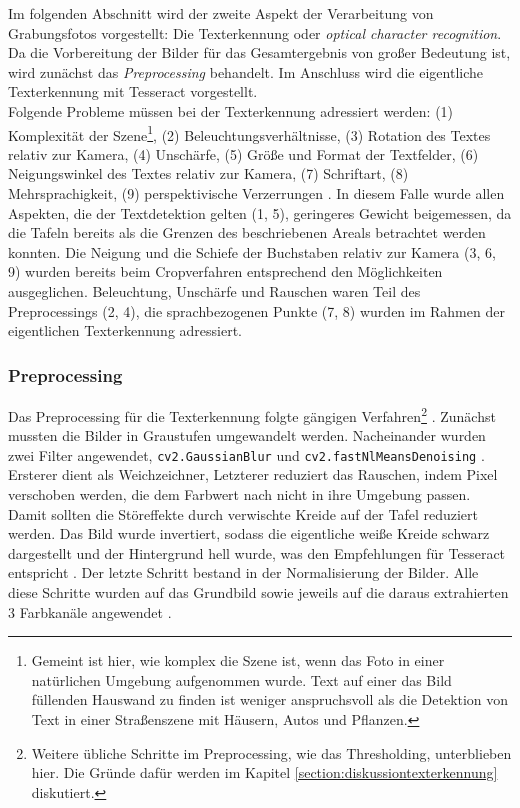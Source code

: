 Im folgenden Abschnitt wird der zweite Aspekt der Verarbeitung von Grabungsfotos vorgestellt: Die Texterkennung oder \textit{optical character recognition}. Da die Vorbereitung der Bilder für das Gesamtergebnis von großer Bedeutung ist, wird zunächst das \textit{Preprocessing} behandelt. Im Anschluss wird die eigentliche Texterkennung mit Tesseract vorgestellt.\\
Folgende Probleme müssen bei der Texterkennung adressiert werden: (1) Komplexität der Szene\footnote{Gemeint ist hier, wie komplex die Szene ist, wenn das Foto in einer natürlichen Umgebung aufgenommen wurde. Text auf einer das Bild füllenden Hauswand zu finden ist weniger anspruchsvoll als die Detektion von Text in einer Straßenszene mit Häusern, Autos und Pflanzen.}, (2) Beleuchtungsverhältnisse, (3) Rotation des Textes relativ zur Kamera, (4) Unschärfe, (5) Größe und Format der Textfelder, (6) Neigungswinkel des Textes relativ zur Kamera, (7) Schriftart, (8) Mehrsprachigkeit, (9) perspektivische Verzerrungen \cite{hamad}. In diesem Falle wurde allen Aspekten, die der Textdetektion gelten (1, 5), geringeres Gewicht beigemessen, da die Tafeln bereits als die Grenzen des beschriebenen Areals betrachtet werden konnten. Die Neigung und die Schiefe der Buchstaben relativ zur Kamera (3, 6, 9) wurden bereits beim Cropverfahren entsprechend den Möglichkeiten ausgeglichen. Beleuchtung, Unschärfe und Rauschen waren Teil des Preprocessings (2, 4), die sprachbezogenen Punkte (7, 8) wurden im Rahmen der eigentlichen Texterkennung adressiert.

\subsubsection{Preprocessing}

Das Preprocessing für die Texterkennung folgte gängigen Verfahren\footnote{Weitere übliche Schritte im Preprocessing, wie das Thresholding, unterblieben hier. Die Gründe dafür werden im Kapitel \ref{section:diskussiontexterkennung} diskutiert.} \cite{jenilshah}{}  \cite{sumedhahallale}. Zunächst mussten die Bilder in Graustufen umgewandelt werden. Nacheinander wurden zwei Filter angewendet, \verb|cv2.GaussianBlur| \cite{opencvfilter}{} und \verb|cv2.fastNlMeansDenoising| \cite{opencvdenoise}. Ersterer dient als Weichzeichner, Letzterer reduziert das Rauschen, indem Pixel verschoben werden, die dem Farbwert nach nicht in ihre Umgebung passen. Damit sollten die Störeffekte durch verwischte Kreide auf der Tafel reduziert werden. Das Bild wurde invertiert, sodass die eigentliche weiße Kreide schwarz dargestellt und der Hintergrund hell wurde, was den Empfehlungen für Tesseract entspricht \cite{tesseractoptimum}. Der letzte Schritt bestand in der Normalisierung der Bilder. Alle diese Schritte wurden auf das Grundbild sowie jeweils auf die daraus extrahierten 3 Farbkanäle angewendet \cite{xilinchen}.

